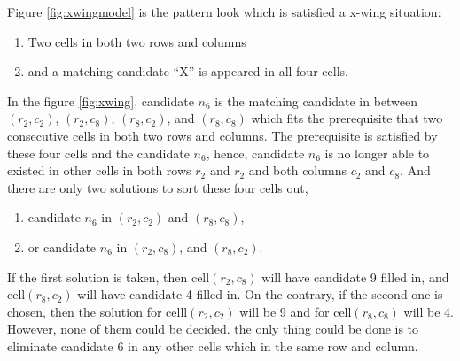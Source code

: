 \documentclass[11pt]{report}
\begin{document}
Figure \ref{fig:xwingmodel} is the pattern look which is satisfied a x-wing situation:
\begin{enumerate}
\item Two cells in both two rows and columns
\item and a matching candidate ``X''  is appeared in all four cells.
\end{enumerate}

In the figure \ref{fig:xwing}, candidate $n_{6}$ is the matching candidate in between $(r_{2}, c_{2})$, $(r_{2}, c_{8})$, $(r_{8}, c_{2})$, and $(r_{8}, c_{8})$ which fits the prerequisite that two consecutive cells in both two rows and columns. The prerequisite is satisfied by these four cells and the candidate $n_{6}$, hence, candidate $n_{6}$ is no longer able to existed in other cells in both rows $r_{2}$ and $r_{2}$ and both columns $c_{2}$ and $c_{8}$. And there are only two solutions to sort these four cells out,
\begin{enumerate}
\item candidate $n_{6}$ in $(r_{2}, c_{2})$ and $(r_{8}, c_{8})$,
\item or candidate $n_{6}$ in $(r_{2}, c_{8})$, and $(r_{8}, c_{2})$.
\end{enumerate}
If the first solution is taken, then cell$(r_{2}, c_{8})$ will have candidate 9 filled in, and cell$(r_{8}, c_{2})$ will have candidate 4 filled in. On the contrary, if the second one is chosen, then the solution for celll$(r_{2}, c_{2})$ will be 9 and for cell$(r_{8}, c_{8})$ will be 4. However, none of them could be decided. the only thing could be done is to eliminate candidate 6 in any other cells which in the same row and column.
\end{document}
